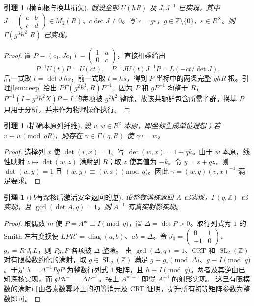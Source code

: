 \documentclass[11pt,a4paper]{article}
\newcommand{\ZZ}{\mathbb Z}
\newcommand{\SL}{\operatorname{SL}}
\newcommand{\diag}{\operatorname{diag}}
\newtheorem{lemma}[theorem]{引理}
\theoremstyle{definition}
\numberwithin{equation}{section}
\begin{document}
\begin{lemma}[横向根与换基损失]\label{lem:transverse}
假设全部 $U(hR)$ 及 $J,J^{-1}$ 已实现，其中 $J=\left(\begin{smallmatrix}a&b\\c&d\end{smallmatrix}\right)\in M_2(R)$、$c\det J\ne0$。写 $c=g\varepsilon$，$g\in\ZZ\setminus\{0\}$、$\varepsilon\in R^\times$。则 $\Gamma(g^3h^2,R)$ 已实现。
\end{lemma}
\begin{proof}
置 $P=(e_1,Je_1)=\left(\begin{smallmatrix}1&a\\0&c\end{smallmatrix}\right)$，直接相乘给出
\[
 P^{-1}U(t)P=U(ct),\quad P^{-1}JU(t)J^{-1}P=L(-ct/\det J).
\]
后一式取 $t=\det J\,hs$，前一式取 $t=hs$，得到 $P$ 坐标中的两条完整 $ghR$ 根。引理\ref{lem:deep} 给出 $P\Gamma(g^2h^2,R)P^{-1}$。因为 $P$ 和 $gP^{-1}$ 均整于 $R$，$P^{-1}(I+g^3h^2X)P-I$ 的每项被 $g^2h^2$ 整除，故该共轭群包含所需子群。换基 $P$ 只用于分析，并未作为物理操作执行。
\end{proof}

\begin{lemma}[精确本原列纤维]\label{lem:fiber}
设 $v,w\in R^2$ 本原，即坐标生成单位理想；若 $v\equiv w\pmod{qR}$，则存在 $\gamma\in\Gamma(q,R)$ 使 $\gamma v=w$。
\end{lemma}
\begin{proof}
选择列 $x$ 使 $\det(v,x)=1$。写 $\det(w,x)=1+qk$。由于 $w$ 本原，线性映射 $z\mapsto\det(w,z)$ 满射到 $R$；取 $z$ 使其值为 $-k$。令 $y=x+qz$，则 $\det(w,y)=1$ 且 $(w,y)\equiv(v,x)\pmod q$。因此 $\gamma=(w,y)(v,x)^{-1}$ 满足要求。
\end{proof}

\begin{lemma}[已有深核后激活安全返回的逆]\label{lem:smith}
设整数满秩返回 $A$ 已实现，$\Gamma(q,\ZZ)$ 已实现，且 $\gcd(\det A,q)=1$。则 $A^{-1}$ 有真实射影实现。
\end{lemma}
\begin{proof}
取偶数 $m$ 使 $P=A^m\equiv I\pmod q$，置 $\Delta=\det P>0$。取行列式为 $1$ 的 Smith 左右变换使 $LPR'=\diag(a,b)$、$ab=\Delta$。令 $J_0=\left(\begin{smallmatrix}0&1\\-1&0\end{smallmatrix}\right)$、$g_*=R'J_0L$，则 $Pg_*P$ 各项被 $\Delta$ 整除。
由 $\gcd(\Delta,q)=1$、CRT 和 $\SL_2(\ZZ)$ 对有限模数约化的满射，取 $g\in\SL_2(\ZZ)$ 满足 $g\equiv g_*\pmod\Delta$、$g\equiv I\pmod q$。于是 $h=\Delta^{-1}PgP$ 为整数行列式 $1$ 矩阵，且 $h\equiv I\pmod q$。两者及其逆由已知深核实现，而 $gPh^{-1}=\Delta P^{-1}$。接上 $A^{m-1}$ 即得 $A^{-1}$ 的射影实现。
这里有限模数的满射可由各素数幂环上的初等消元及 CRT 证明，提升所有初等矩阵参数为整数即可。
\end{proof}
\end{document}
